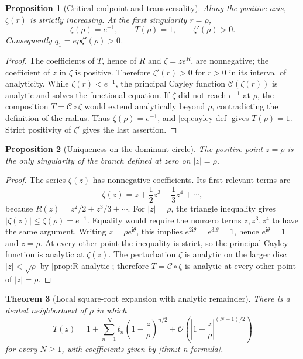 \documentclass[11pt,oneside]{article}
\numberwithin{equation}{section}
\theoremstyle{plain}
\newtheorem{theorem}{Theorem}[section]
\newtheorem{proposition}[theorem]{Proposition}
\theoremstyle{definition}
\theoremstyle{remark}
\newcommand{\ii}{\mathrm i}
\newcommand{\Ord}{\mathcal O}
\newcommand{\Cay}{\mathcal C}
\begin{document}
\begin{proposition}[Critical endpoint and transversality]
\label{prop:critical-transverse}
Along the positive axis, $\zeta(r)$ is strictly increasing.  At the first
singularity $r=\rho$,
\[
 \zeta(\rho)=e^{-1},\qquad T(\rho)=1,
 \qquad \zeta'(\rho)>0.
\]
Consequently $q_1=e\rho\zeta'(\rho)>0$.
\end{proposition}

\begin{proof}
The coefficients of $T$, hence of $R$ and $\zeta=z e^R$, are nonnegative;
the coefficient of $z$ in $\zeta$ is positive.  Therefore $\zeta'(r)>0$
for $r>0$ in its interval of analyticity.  While $\zeta(r)<e^{-1}$, the
principal Cayley function $\Cay(\zeta(r))$ is analytic and solves the
functional equation.  If $\zeta$ did not reach $e^{-1}$ at $\rho$, the
composition $T=\Cay\circ\zeta$ would extend analytically beyond $\rho$,
contradicting the definition of the radius.  Thus
$\zeta(\rho)=e^{-1}$, and \eqref{eq:cayley-def} gives $T(\rho)=1$.
Strict positivity of $\zeta'$ gives the last assertion.
\end{proof}

\begin{proposition}[Uniqueness on the dominant circle]
\label{prop:unique-dominant}
The positive point $z=\rho$ is the only singularity of the branch defined at
zero on $|z|=\rho$.
\end{proposition}

\begin{proof}
The series $\zeta(z)$ has nonnegative coefficients.  Its first relevant
terms are
\[
 \zeta(z)=z+\frac12z^3+\frac13z^4+\cdots,
\]
because $R(z)=z^2/2+z^3/3+\cdots$.  For $|z|=\rho$, the triangle inequality
gives $|\zeta(z)|\le\zeta(\rho)=e^{-1}$.  Equality would require the nonzero
terms $z,z^3,z^4$ to have the same argument.  Writing $z=\rho e^{\ii\theta}$,
this implies $e^{2\ii\theta}=e^{3\ii\theta}=1$, hence
$e^{\ii\theta}=1$ and $z=\rho$.  At every other point the inequality is
strict, so the principal Cayley function is analytic at $\zeta(z)$.  The
perturbation $\zeta$ is analytic on the larger disc $|z|<\sqrt\rho$ by
\cref{prop:R-analytic}; therefore $T=\Cay\circ\zeta$ is analytic at every
other point of $|z|=\rho$.
\end{proof}

\begin{theorem}[Local square-root expansion with analytic remainder]
\label{thm:local-square-root-detailed}
There is a dented neighborhood of $\rho$ in which
\[
 T(z)=1+\sum_{n=1}^{N}t_n\left(1-\frac z\rho\right)^{n/2}
 +\Ord\!\left(\left|1-\frac z\rho\right|^{(N+1)/2}\right)
\]
for every $N\ge1$, with coefficients given by
\cref{thm:t-n-formula}.
\end{theorem}
\end{document}
